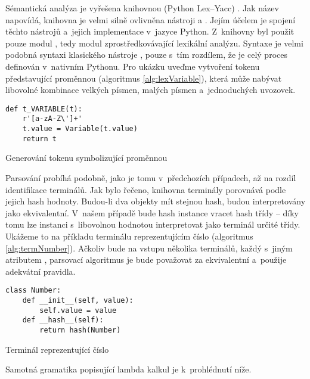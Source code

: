 		Sémantická analýza je vyřešena knihovnou  (Python Lex--Yacc) \cite{PLY}. Jak název napovídá, knihovna je velmi silně ovlivněna nástroji  a . Jejím účelem je spojení těchto nástrojů a~jejich implementace v~jazyce Python. Z~knihovny byl použit pouze modul , tedy modul zprostředkovávající lexikální analýzu. Syntaxe je velmi podobná syntaxi klasického nástroje , pouze s~tím rozdílem, že je celý proces definován v~nativním Pythonu. Pro ukázku uveďme vytvoření tokenu představující proměnnou (algoritmus \ref{alg:lexVariable}), která může nabývat libovolné kombinace velkých písmen, malých písmen a~jednoduchých uvozovek.
		
		\begin{listing}
			\begin{verbatim}
def t_VARIABLE(t):
	r'[a-zA-Z\']+'
	t.value = Variable(t.value)
	return t
			\end{verbatim}
			\caption{Generování tokenu symbolizující proměnnou}
			\label{alg:lexVariable}
		\end{listing}
	
		Parsování probíhá podobně, jako je tomu v~předchozích případech, až na rozdíl identifikace terminálů. Jak bylo řečeno, knihovna terminály porovnává podle jejich hash hodnoty. Budou-li dva objekty mít stejnou hash, budou interpretovány jako ekvivalentní. V~našem případě bude hash instance vracet hash třídy -- díky tomu lze instanci s~libovolnou hodnotou interpretovat jako terminál určité třídy. Ukážeme to na příkladu terminálu reprezentujícím číslo (algoritmus \ref{alg:termNumber}). Ačkoliv bude na vstupu několika terminálů, každý s~jiným atributem , parsovací algoritmus je bude považovat za ekvivalentní a~použije adekvátní pravidla.
	
		\begin{listing}
			\begin{verbatim}
class Number:
	def __init__(self, value):
		self.value = value
	def __hash__(self):
		return hash(Number)
			\end{verbatim}
			\caption{Terminál reprezentující číslo}
			\label{alg:termNumber}
		\end{listing}
	
		Samotná gramatika \GrammarDef\space popisující lambda kalkul je k~prohlédnutí níže.
	
